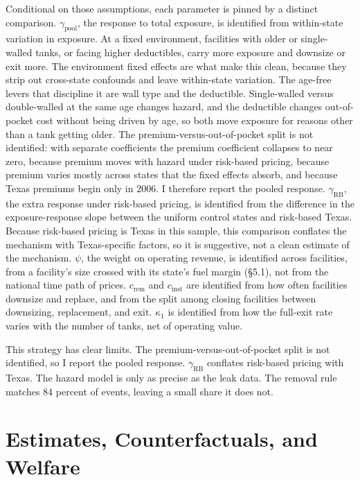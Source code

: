 \documentclass[
  12pt,
]{article}
\begin{document}
Conditional on those assumptions, each parameter is pinned by a distinct
comparison. \(\gamma_{\text{pool}}\), the response to total exposure, is
identified from within-state variation in exposure. At a fixed
environment, facilities with older or single-walled tanks, or facing
higher deductibles, carry more exposure and downsize or exit more. The
environment fixed effects are what make this clean, because they strip
out cross-state confounds and leave within-state variation. The age-free
levers that discipline it are wall type and the deductible.
Single-walled versus double-walled at the same age changes hazard, and
the deductible changes out-of-pocket cost without being driven by age,
so both move exposure for reasons other than a tank getting older. The
premium-versus-out-of-pocket split is not identified: with separate
coefficients the premium coefficient collapses to near zero, because
premium moves with hazard under risk-based pricing, because premium
varies mostly across states that the fixed effects absorb, and because
Texas premiums begin only in 2006. I therefore report the pooled
response. \(\gamma_{\text{RB}}\), the extra response under risk-based
pricing, is identified from the difference in the exposure-response
slope between the uniform control states and risk-based Texas. Because
risk-based pricing is Texas in this sample, this comparison conflates
the mechanism with Texas-specific factors, so it is suggestive, not a
clean estimate of the mechanism. \(\psi\), the weight on operating
revenue, is identified across facilities, from a facility's size crossed
with its state's fuel margin (§5.1), not from the national time path of
prices. \(c_{\text{rem}}\) and \(c_{\text{inst}}\) are identified from
how often facilities downsize and replace, and from the split among
closing facilities between downsizing, replacement, and exit.
\(\kappa_1\) is identified from how the full-exit rate varies with the
number of tanks, net of operating value.

This strategy has clear limits. The premium-versus-out-of-pocket split
is not identified, so I report the pooled response.
\(\gamma_{\text{RB}}\) conflates risk-based pricing with Texas. The
hazard model is only as precise as the leak data. The removal rule
matches 84 percent of events, leaving a small share it does not.

\section{Estimates, Counterfactuals, and
Welfare}\label{estimates-counterfactuals-and-welfare}
\end{document}
